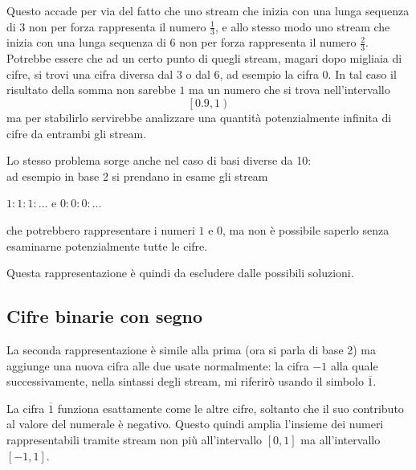 \documentclass[Lau]{sapthesis}
\begin{document}
Questo accade per via del fatto che uno stream che inizia con una lunga sequenza 
di 3 non per forza rappresenta il numero $\frac{1}{3}$, e allo stesso modo uno 
stream che inizia con una lunga sequenza di 6 non per forza rappresenta il 
numero $\frac{2}{3}$. Potrebbe essere che 
ad un certo punto di quegli stream, magari dopo migliaia di cifre, si trovi una 
cifra diversa dal 3 o dal 6, ad esempio la cifra 0. In tal caso il risultato 
della somma 
non sarebbe $1$ ma un numero che si trova nell'intervallo
$$\left[0.9,1\right)$$
ma per stabilirlo servirebbe analizzare una quantità potenzialmente infinita di 
cifre da entrambi gli stream.

\medskip

Lo stesso problema sorge anche nel caso di basi diverse da 10:\\
ad esempio in base 2 si prendano in esame gli stream
\begin{center}
$1:1:1:\ldots$ \hspace{0.5cm} e \hspace{0.5cm} $0:0:0:\ldots$
\end{center}
che potrebbero rappresentare i numeri $1$ e $0$, ma non è possibile saperlo 
senza esaminarne potenzialmente tutte le cifre.

\medskip

Questa rappresentazione è quindi da escludere dalle possibili soluzioni.


\subsection{Cifre binarie con segno}
La seconda rappresentazione \cite{DavePlume} è simile alla prima (ora si parla di base 2) ma 
aggiunge una nuova cifra alle due usate normalmente: la cifra $-1$ alla quale 
successivamente, nella 
sintassi degli stream, mi riferirò usando il simbolo $\overline{1}$.

La cifra $\overline{1}$ funziona esattamente come le altre cifre, soltanto che 
il suo contributo al valore del numerale è negativo. Questo quindi amplia 
l'insieme dei numeri rappresentabili tramite stream non più all'intervallo 
$\left[0,1\right]$ ma all'intervallo $\left[-1,1\right]$.
\end{document}
